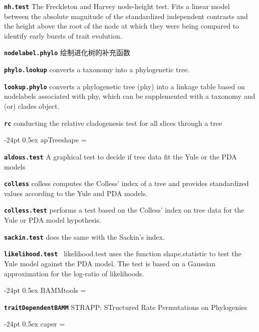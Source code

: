 \documentclass[10pt,landscape]{article}
\makeatletter
\renewcommand\section{\@startsection{section}{1}{0mm}%
                                     {-24pt}%
                                     {0.5ex}%
                                {\color{blue}\normalfont\large\bfseries}}
\newcommand{\bcode}[1]{\texttt{\textbf{#1}}}
\makeatother
\begin{document}
\begin{CJK}{UTF8}{gbsn}
\begin{multicols}{3}
\bcode{nh.test} The Freckleton and Harvey node-height test. Fits a linear model between the absolute magnitude of the standardized independent contrasts and the height above the root of the node at which they were being compared to identify early bursts of trait evolution.

\bcode{nodelabel.phylo} 绘制进化树的补充函数

\bcode{phylo.lookup} converts a taxonomy into a phylogenetic tree.

\bcode{lookup.phylo}  converts a phylogenetic tree (phy) into a linkage table based on nodelabels associated with phy, which can be supplemented with a taxonomy and (or) clades object.

\bcode{rc} conducting the relative cladogenesis test for all slices through a tree


\section{apTreeshape}
\everypar={\hangindent=9mm}

\bcode{aldous.test} A graphical test to decide if tree data fit the Yule or the PDA models

\bcode{colless} colless computes the Colless' index of a tree and provides standardized values according to the Yule and PDA models.

\bcode{colless.test} performs a test based on the Colless' index on tree data for the Yule or PDA model hypothesis. 

\bcode{sackin.test} does the same with the Sackin's index. 

\bcode{likelihood.test } likelihood.test uses the function shape.statistic to test the Yule model against the PDA model. The test is based on a Gaussian approximation for the log-ratio of likelihoods.

\section{BAMMtools}
\everypar={\hangindent=9mm}

\bcode{traitDependentBAMM} STRAPP: STructured Rate Permutations on Phylogenies

\section{caper}
\everypar={\hangindent=9mm}


\end{multicols}
\end{CJK}
\end{document}
